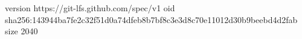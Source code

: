 version https://git-lfs.github.com/spec/v1
oid sha256:143944ba7fe2c32f51d0a74dfeb8b7bf8c3e3d8c70e11012d30b9beebd4d2fab
size 2040
